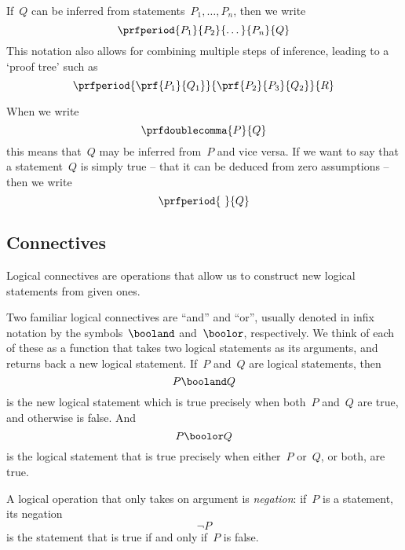 If~$Q$ can be inferred from statements~$P_1, \ldots, P_n$, then we write
\begin{equation*}
    \prfperiod{
        P_1}{P_2}{\dots}{P_n}{Q}
\end{equation*}
This notation also allows for combining multiple steps of inference, leading to a `proof tree' such as
\begin{equation*}
    \prfperiod
    {\prf{P_1}{Q_1}}{\prf{P_2}{P_3}{Q_2}}{R}
\end{equation*}

When we write
\begin{equation*}
    \prfdoublecomma{
        P
    }{
        Q
    }
\end{equation*}
this means that~$Q$ may be inferred from~$P$ and vice versa.
If we want to say that a statement~$Q$ is simply true -- that it can be deduced from zero assumptions -- then we write
\begin{equation*}
    \prfperiod{
        \
    }{
        Q
    }
\end{equation*}

\subsection{Connectives}

Logical connectives are operations that allow us to construct new logical statements from given ones.

Two familiar logical connectives are ``and'' and ``or'', usually denoted in infix notation by the symbols~$\booland$ and~$\boolor$, respectively.
We think of each of these as a function that takes two logical statements as its arguments, and returns back a new logical statement.
If~$P$ and~$Q$ are logical statements, then~
\begin{equation*}
    P \booland Q
\end{equation*}
is the new logical statement which is true precisely when both~$P$ and~$Q$ are true, and otherwise is false.
And
\begin{equation*}
    P \boolor Q
\end{equation*}
is the logical statement that is true precisely when either~$P$ or~$Q$, or both, are true.

A logical operation that only takes on argument is \emph{negation}: if~$P$ is a statement, its negation
\begin{equation*}
    \lnot P
\end{equation*}
is the statement that is true if and only if~$P$ is false.

